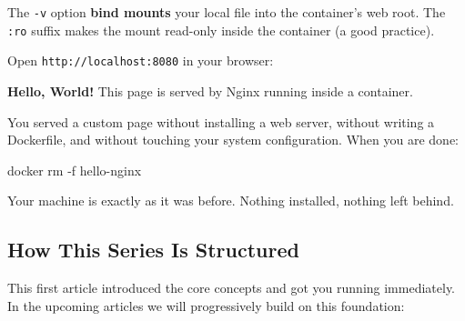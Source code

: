 \documentclass[11pt,american,a4paper,openany]{book}
\renewenvironment{quote}{\begin{quoteblock}}{\end{quoteblock}}
\newenvironment{Shaded}{}{}
\newcommand{\NormalTok}[1]{#1}
\begin{document}
\begin{Shaded}
\end{Shaded}

The \texttt{-v} option \textbf{bind mounts} your local file into the
container's web root. The \texttt{:ro} suffix makes the mount read-only
inside the container (a good practice).

Open \texttt{http://localhost:8080} in your browser:

\begin{quote}
\textbf{Hello, World!} This page is served by Nginx running inside a
container.
\end{quote}

You served a custom page without installing a web server, without
writing a Dockerfile, and without touching your system configuration.
When you are done:

\begin{Shaded}
\begin{Highlighting}[]
\NormalTok{docker rm {-}f hello{-}nginx}
\end{Highlighting}
\end{Shaded}

Your machine is exactly as it was before. Nothing installed, nothing
left behind.

\subsection{How This Series Is
Structured}\label{how-this-series-is-structured}

This first article introduced the core concepts and got you running
immediately. In the upcoming articles we will progressively build on
this foundation:
\end{document}
